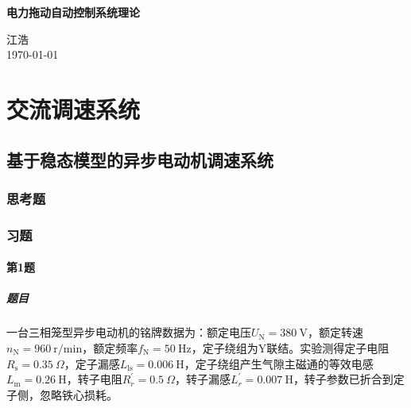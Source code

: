 \documentclass[12pt, a4paper, UTF8, fontset=adobe, oneside]{ctexbook} %
\begin{document}
\frontmatter
\begin{titlepage}
\begin{center}

\vspace*{5cm}
{\huge \bfseries 电力拖动自动控制系统理论}\\[0.4cm]

\vspace{12cm}

{\large 江浩} \\[1cm]
{\large \today}

\end{center}
\end{titlepage}

{
\hypersetup{linkcolor=black} %
\tableofcontents %
}

\mainmatter %

\part{交流调速系统}

\chapter{基于稳态模型的异步电动机调速系统}

\section{思考题}

\section{习题}
\subsection{第1题}
\subsubsection{题目}
一台三相笼型异步电动机的铭牌数据为：额定电压$U_{\mathrm{N}}=380\ \mathrm{V}$，额定转速$n_{\mathrm{N}}=960\ \mathrm{r/min}$，额定频率$f_{\mathrm{N}}=50\ \mathrm{Hz}$，定子绕组为Y联结。实验测得定子电阻$R_{\mathrm{s}}=0.35\ \Omega$，定子漏感$L_{\mathrm{ls}}=0.006\ \mathrm{H}$，定子绕组产生气隙主磁通的等效电感$L_{\mathrm{m}}=0.26\ \mathrm{H}$，转子电阻$R_r^{'}=0.5\ \Omega$，转子漏感$L_{r}^{'}=0.007\ \mathrm{H}$，转子参数已折合到定子侧，忽略铁心损耗。
\end{document}
